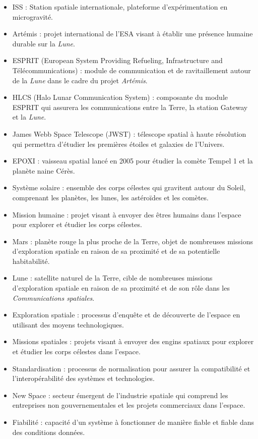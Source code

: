 \documentclass[conference]{IEEEtran}
\begin{document}
\begin{itemize}
\item ISS : Station spatiale internationale, plateforme d'expérimentation en microgravité.
\item Artémis : projet international de l'ESA visant à établir une présence humaine durable sur la \emph{Lune}.
\item ESPRIT (European System Providing Refueling, Infrastructure and Télécommunications) : module de communication et de ravitaillement autour de la \emph{Lune} dans le cadre du projet \emph{Artémis}.
\item HLCS (Halo Lunar Communication System) : composante du module ESPRIT qui assurera les communications entre la Terre, la station Gateway et la \emph{Lune}.
\item James Webb Space Telescope (JWST) : télescope spatial à haute résolution qui permettra d'étudier les premières étoiles et galaxies de l'Univers.
\item EPOXI : vaisseau spatial lancé en 2005 pour étudier la comète Tempel 1 et la planète naine Cérès.
\item Système solaire : ensemble des corps célestes qui gravitent autour du Soleil, comprenant les planètes, les lunes, les astéroïdes et les comètes.
\item Mission humaine : projet visant à envoyer des êtres humains dans l'espace pour explorer et étudier les corps célestes.
\item Mars : planète rouge la plus proche de la Terre, objet de nombreuses missions d'exploration spatiale en raison de sa proximité et de sa potentielle habitabilité.
\item Lune : satellite naturel de la Terre, cible de nombreuses missions d'exploration spatiale en raison de sa proximité et de son rôle dans les \emph{Communications spatiales}.
\item Exploration spatiale : processus d'enquête et de découverte de l'espace en utilisant des moyens technologiques.
\item Missions spatiales : projets visant à envoyer des engins spatiaux pour explorer et étudier les corps célestes dans l'espace.
\item Standardisation : processus de normalisation pour assurer la compatibilité et l'interopérabilité des systèmes et technologies.
\item New Space : secteur émergent de l'industrie spatiale qui comprend les entreprises non gouvernementales et les projets commerciaux dans l'espace.
\item Fiabilité : capacité d'un système à fonctionner de manière fiable et fiable dans des conditions données.

\end{itemize}
\end{document}
